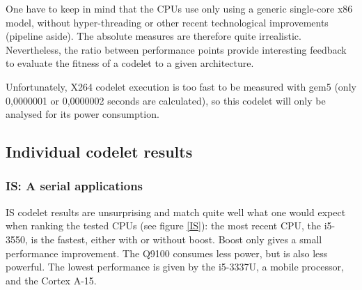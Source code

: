 \documentclass{article}
\begin{document}
\begin{multicols}{2}
One have to keep in mind that the CPUs use only using a generic single-core x86 model, without hyper-threading or other recent technological improvements (pipeline aside). The absolute measures are therefore quite irrealistic. Nevertheless, the ratio between performance points provide interesting feedback to evaluate the fitness of a codelet to a given architecture.

Unfortunately, X264 codelet execution is too fast to be measured with gem5 (only 0,0000001 or 0,0000002 seconds are calculated), so this codelet will only be analysed for its power consumption. 




\subsection{Individual codelet results}

\subsubsection{IS: A serial applications}
IS codelet results are unsurprising and match quite well what one would expect when ranking the tested CPUs (see figure \ref{IS}): the most recent CPU, the i5-3550, is the fastest, either with or without boost. Boost only gives a small performance improvement. The Q9100 consumes less power, but is also less powerful. The lowest performance is given by the i5-3337U, a mobile processor, and the Cortex A-15.


\end{multicols}
\end{document}
